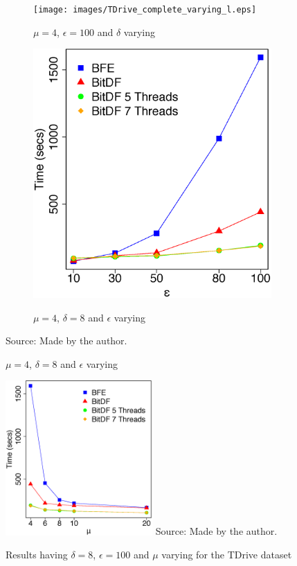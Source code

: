 {\begin{figure}[h!]
    \centering
    \caption{Results varying $\delta$ and $\epsilon$ for TDrive dataset}
    \begin{subfigure}[t]{0.49\textwidth}
        \caption{$\mu = 4$, $\epsilon = 100$ and $\delta$ varying}
        \texttt{[image: images/TDrive\_complete\_varying\_l.eps]}
        \label{fig:tdrive_complete_vary_l}
    \end{subfigure}
    \begin{subfigure}[t]{0.49\textwidth}
        \caption{$\mu = 4$, $\delta = 8$ and $\epsilon$ varying}
        \includegraphics[width=\textwidth]{images/TDrive_complete_varying_g.eps}
        \label{fig:tdrive_complete_vary_g}
    \end{subfigure}
    \footnotesize{Source: Made by the author.}
    \label{fig:tdrive_complete_results}
\end{figure}

\begin{figure}[h!]
    \centering
    \caption{Results having $\delta = 8$, $\epsilon = 100$ and $\mu$ varying for the TDrive dataset}
    \includegraphics[width=0.5\textwidth]{images/TDrive_complete_varying_n.eps}
    \footnotesize{Source: Made by the author.}
    \label{fig:tdrive_complete_vary_n}
\end{figure}

}
